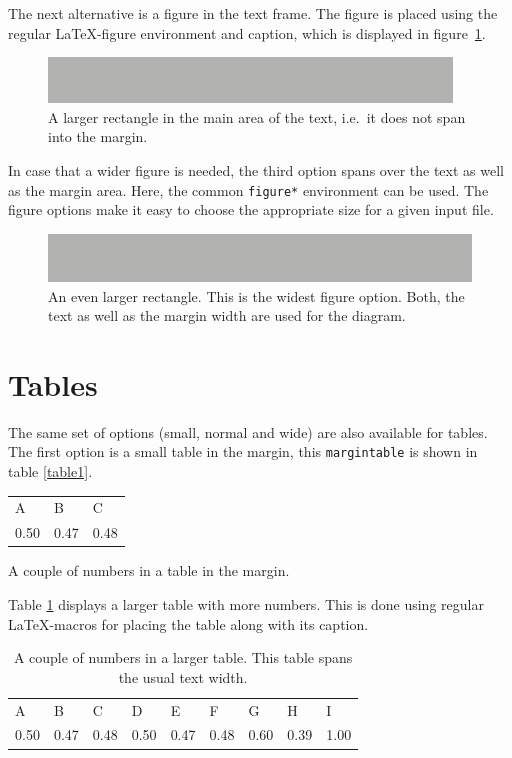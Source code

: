 \documentclass{caesar_book}
\begin{document}
The next alternative is a figure in the text frame. The figure is placed using the regular \LaTeX-figure environment and  caption, which is displayed in figure~\ref{rectangle2}. 
%
\begin{figure}[htbp]%
	\includegraphics[width=\textwidth]{rectangle}%
	\caption{A larger rectangle in the main area of the text, i.e.\ it does not span into the margin.}%
	\label{rectangle2}%
\end{figure}%
%

In case that a wider figure is needed, the third option spans over the text as well as the margin area. Here, the common \texttt{figure*} environment can be used. The figure options make it easy to choose the appropriate size for a given input file. 
%
\begin{figure}[htbp]
    \includegraphics[width=400pt]{rectangle}%
    \caption{An even larger rectangle. This is the widest figure option. Both, the text as well as the margin width are used for the diagram.}
    \label{rectangle3}
\end{figure}
%

\section{Tables}
The same set of options (small, normal and wide) are also available for tables. The first option is a small table in the margin, this \texttt{margintable} is shown in table \ref{table1}.
%
\begin{margintable}%
	\begin{tabular}{lll}%
     A&B&C\\%
     0.50&0.47&0.48\\%
    \end{tabular}%
	\vspace{2pt}
	\caption{A couple of numbers in a table in the margin.\label{table1}}%
\end{margintable}%

Table \ref{table2} displays a larger table with more numbers. This is done using regular \LaTeX-macros for placing the table along with its caption. 
%
\begin{table}[htbp]%
	 \begin{tabular}{lllllllll}%
     A&B&C&D&E&F&G&H&I\\%
    0.50&0.47&0.48&0.50&0.47&0.48&0.60&0.39&1.00\\%
    \end{tabular}%
	\vspace{2pt}%
	\captionsetup{width=\textwidth, justification=justified}%
	\caption{A couple of numbers in a larger table. This table spans the usual text width.\label{table2}}%
\end{table}%
\end{document}
